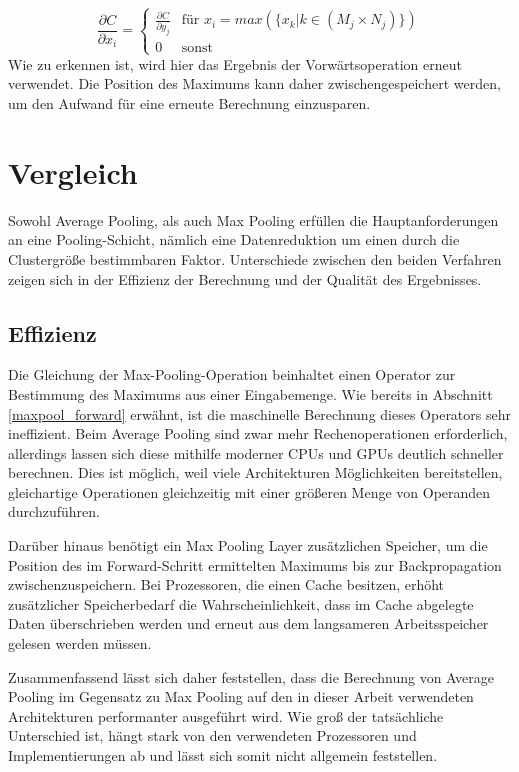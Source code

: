 \documentclass[../main.tex]{subfiles}
\begin{document}
\begin{equation} \label{eq:pooling_backprop_max_final}
   \frac{\partial C}{\partial x_i} = 
   \begin{cases}
     \frac{\partial C}{\partial y_j} & \text{für } x_i = max( \{x_k | k \in (M_j \times N_j)\}) \\
     0 & \text{sonst}
   \end{cases}
\end{equation}
Wie zu erkennen ist, wird hier das Ergebnis der Vorwärtsoperation erneut verwendet. Die Position des Maximums kann daher zwischengespeichert werden, um den Aufwand für eine erneute Berechnung einzusparen. 

\section{Vergleich}
Sowohl Average Pooling, als auch Max Pooling erfüllen die Hauptanforderungen an eine Pooling-Schicht, nämlich eine Datenreduktion um einen durch die Clustergröße bestimmbaren Faktor. Unterschiede zwischen den beiden Verfahren zeigen sich in der Effizienz der Berechnung und der Qualität des Ergebnisses. 

\subsection{Effizienz}
Die Gleichung der Max-Pooling-Operation beinhaltet einen Operator zur Bestimmung des Maximums aus einer Eingabemenge. Wie bereits in Abschnitt \ref{maxpool_forward} erwähnt, ist die maschinelle Berechnung dieses Operators sehr ineffizient. Beim Average Pooling sind zwar mehr Rechenoperationen erforderlich, allerdings lassen sich diese mithilfe moderner CPUs und GPUs deutlich schneller berechnen. Dies ist möglich, weil viele Architekturen Möglichkeiten bereitstellen, gleichartige Operationen gleichzeitig mit einer größeren Menge von Operanden durchzuführen. 

Darüber hinaus benötigt ein Max Pooling Layer zusätzlichen Speicher, um die Position des im Forward-Schritt ermittelten Maximums bis zur Backpropagation zwischenzuspeichern. Bei Prozessoren, die einen Cache besitzen, erhöht zusätzlicher Speicherbedarf die Wahrscheinlichkeit, dass im Cache abgelegte Daten überschrieben werden und erneut aus dem langsameren Arbeitsspeicher gelesen werden müssen. 

Zusammenfassend lässt sich daher feststellen, dass die Berechnung von Average Pooling im Gegensatz zu Max Pooling auf den in dieser Arbeit verwendeten Architekturen performanter ausgeführt wird. Wie groß der tatsächliche Unterschied ist, hängt stark von den verwendeten Prozessoren und Implementierungen ab und lässt sich somit nicht allgemein feststellen. 
\end{document}
